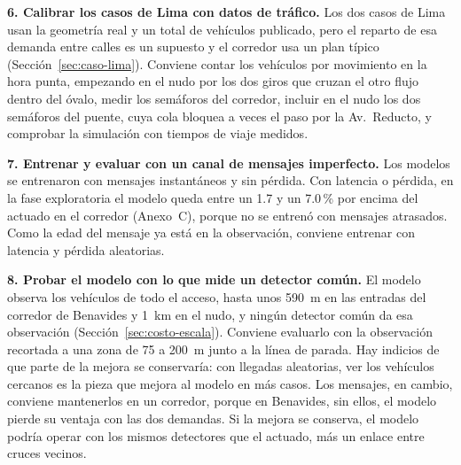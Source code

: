 \noindent\textbf{6. Calibrar los casos de Lima con datos de tráfico.}
Los dos casos de Lima usan la geometría real y un total de vehículos
publicado, pero el reparto de esa demanda entre calles es un supuesto y
el corredor usa un plan típico (Sección~\ref{sec:caso-lima}). Conviene contar los vehículos por
movimiento en la hora punta, empezando en el nudo por los dos giros que
cruzan el otro flujo dentro del óvalo, medir los semáforos del
corredor, incluir en el nudo los dos semáforos del puente, cuya cola
bloquea a veces el paso por la Av.~Reducto, y comprobar la simulación
con tiempos de viaje medidos.

\noindent\textbf{7. Entrenar y evaluar con un canal de mensajes
imperfecto.} Los modelos se entrenaron con mensajes instantáneos y sin
pérdida. Con latencia o pérdida, en la fase exploratoria el modelo
queda entre un 1.7 y un 7.0\,\% por encima del actuado en el corredor
(Anexo~C), porque no se entrenó con mensajes atrasados. Como la
edad del mensaje ya está en la observación, conviene entrenar con
latencia y pérdida aleatorias.

\noindent\textbf{8. Probar el modelo con lo que mide un detector común.}
El modelo observa los vehículos de todo el acceso, hasta unos 590~m en
las entradas del corredor de Benavides y 1~km en el nudo, y ningún
detector común da esa observación (Sección~\ref{sec:costo-escala}).
Conviene evaluarlo con la observación recortada a una zona de 75 a
200~m junto a la línea de parada. Hay indicios de que parte de la
mejora se conservaría: con llegadas aleatorias, ver los vehículos
cercanos es la pieza que mejora al modelo en más casos. Los mensajes,
en cambio, conviene mantenerlos en un corredor, porque en Benavides,
sin ellos, el modelo pierde su ventaja con las dos demandas. Si la
mejora se conserva, el modelo podría operar con los
mismos detectores que el actuado, más un enlace entre cruces vecinos.

